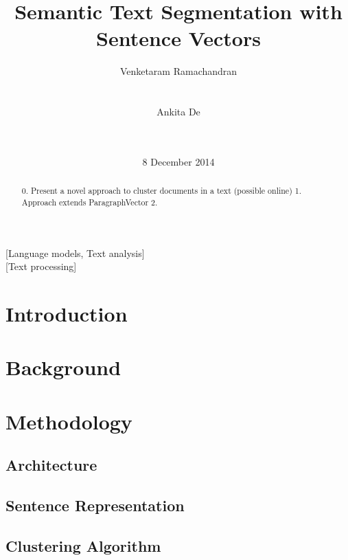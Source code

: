 \documentclass{sig-alternate}
\begin{document}
  \title{Semantic Text Segmentation with Sentence Vectors}

  \author{
  \alignauthor Venketaram Ramachandran\\
  \\
  \\
  \alignauthor Ankita De\\
  \\
  \\
  }

  \date{8 December 2014}
  \maketitle
  \begin{abstract}
    0. Present a novel approach to cluster documents in a text (possible online)
    1. Approach extends ParagraphVector
    2.
  \end{abstract}

  [Language models, Text analysis] \\
  [Text processing]



  \section{Introduction}
  \section{Background}
  \section{Methodology}
  \subsection{Architecture}
  \subsection{Sentence Representation}
  \subsection{Clustering Algorithm}
\end{document}
